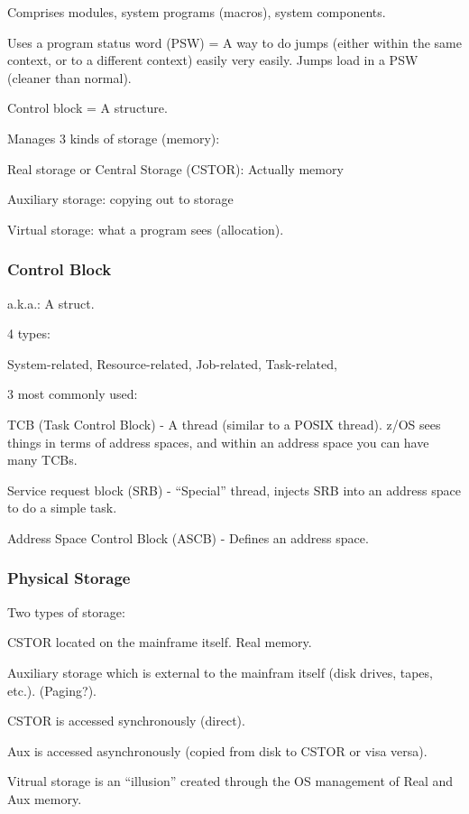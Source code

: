 \documentclass{report}
\begin{document}
Comprises modules, system programs (macros), system components.

Uses a program status word (PSW) = A way to do jumps (either within the same context, or to a different context) easily very easily. Jumps load in a PSW (cleaner than normal).

Control block = A structure.



Manages 3 kinds of storage (memory):

Real storage or Central Storage (CSTOR): Actually memory

Auxiliary storage: copying out to storage

Virtual storage: what a program sees (allocation).

\subsubsection{Control Block}

a.k.a.: A struct.

4 types:

System-related, Resource-related, Job-related, Task-related,



3 most commonly used:

TCB (Task Control Block) - A thread (similar to a POSIX thread). z/OS sees things in terms of address spaces, and within an address space you can have many TCBs.

Service request block (SRB) - ``Special'' thread, injects SRB into an address space to do a simple task.

Address Space Control Block (ASCB) - Defines an address space.



\subsubsection{Physical Storage}

Two types of storage:

CSTOR located on the mainframe itself. Real memory.

Auxiliary storage which is external to the mainfram itself (disk drives, tapes, etc.). (Paging?).

CSTOR is accessed synchronously (direct).

Aux is accessed asynchronously (copied from disk to CSTOR or visa versa).

Vitrual storage is an ``illusion'' created through the OS management of Real and Aux memory.
\end{document}
